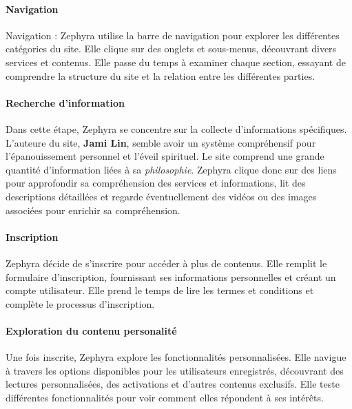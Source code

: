 \documentclass[9pt]{report}
\begin{document}
\begin{multicols*}{2}


  \paragraph{Navigation}
  Navigation : Zephyra utilise la barre de navigation pour explorer 
  les différentes catégories du site. Elle clique sur des onglets et 
  sous-menus, découvrant divers services et contenus. 
  Elle passe du temps à examiner chaque section, essayant de 
  comprendre la structure du site et la relation entre les différentes 
  parties.

  \paragraph{Recherche d'information}
  Dans cette étape, 
  Zephyra se concentre sur la collecte d'informations spécifiques. 
  L'auteure du site, \textbf{Jami Lin}, semble avoir un système  
  compréhensif pour l'épanouissement personnel et l'éveil spirituel. 
  Le site comprend une grande quantité d'information liées à 
  sa \textit{philosophie}. 
  Zephyra clique donc sur des liens pour approfondir sa compréhension des 
  services et  informations, 
  lit des descriptions détaillées et regarde 
  éventuellement des vidéos ou des images associées pour enrichir 
  sa compréhension.




  \paragraph{Inscription}
  Zephyra décide de s'inscrire pour accéder à plus de contenus. Elle 
  remplit le formulaire d'inscription, fournissant ses informations
  personnelles et créant un compte utilisateur. Elle prend le temps de 
  lire les termes et conditions et complète le processus d'inscription.



  \paragraph{Exploration du contenu personalité}
  Une fois inscrite, Zephyra explore les fonctionnalités personnalisées. 
  Elle navigue à travers les options disponibles pour 
  les utilisateurs enregistrés, découvrant des lectures personnalisées, 
  des activations et d'autres contenus exclusifs. Elle teste différentes 
  fonctionnalités pour voir comment elles répondent à ses intérêts.



\end{multicols*}
\end{document}
